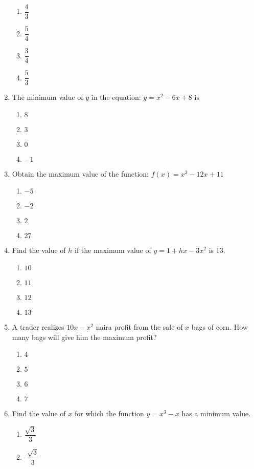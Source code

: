 \begin{multicols}{2}
\begin{enumerate}[label={\arabic*.}]
\begin{enumerate}[label={\Alph*.}]
		\item \(\dfrac{4}{3}\)
		\item \(\dfrac{5}{4}\)
		\item \(\dfrac{3}{4}\)
		\item \(\dfrac{5}{3}\)
	\end{enumerate}
\item The minimum value of \(y\) in the equation: \(y = {x}^{2} - 6x + 8\) is
	\begin{enumerate}[label={\Alph*.}]
		\item \(8\)
		\item \(3\)
		\item \(0\)
		\item \(-1\)
	\end{enumerate}
\item Obtain the maximum value of the function: \(f(x) = {x}^{3} - 12x + 11\)
	\begin{enumerate}[label={\Alph*.}]
		\item \(-5\)
		\item \(-2\)
		\item \(2\)
		\item \(27\)
	\end{enumerate}
\item Find the value of \(h\) if the maximum value of \(y = 1 + hx - 3{x}^{2}\) is 13.
	\begin{enumerate}[label={\Alph*.}]
		\item \(10\)
		\item \(11\)
		\item \(12\)
		\item \(13\)
	\end{enumerate}
\item A trader realizes \(10x - {x}^{2}\) naira profit from the sale of \(x\) bags of corn. How many bags will give him the maximum profit?
	\begin{enumerate}[label={\Alph*.}]
		\item \(4\)
		\item \(5\)
		\item \(6\)
		\item \(7\)
	\end{enumerate}
\item Find the value of \(x\) for which the function \(y = {x}^{3} - x\) has a minimum value.
	\begin{enumerate}[label={\Alph*.}]
		\item \(\dfrac{\sqrt{3}}{3}\)
		\item -\(\dfrac{\sqrt{3}}{3}\)

\end{enumerate}
\end{enumerate}
\end{multicols}
